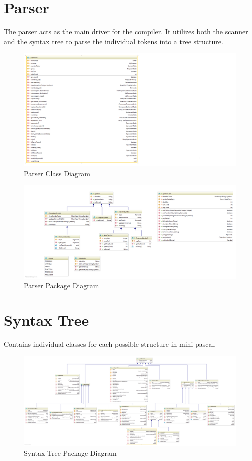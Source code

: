 \documentclass{article}
\begin{document}
\section{Parser}
The parser acts as the main driver for the compiler. It utilizes both the scanner and the syntax tree to parse the individual tokens into a tree structure. 

\begin{figure}[H]
	\includegraphics[width=\linewidth]{parser.png}
	\caption{Parser Class Diagram}
\end{figure}

\begin{figure}[H]
	\includegraphics[width=\linewidth]{parser2.png}
	\caption{Parser Package Diagram}
\end{figure}

\section{Syntax Tree}
Contains individual classes for each possible structure in mini-pascal.

\begin{figure}[H]
	\includegraphics[width=\linewidth]{SyntaxTree.png}
	\caption{Syntax Tree Package Diagram}
\end{figure}
\end{document}
